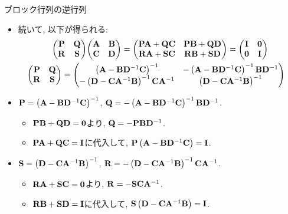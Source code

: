 \documentclass[dvipdfmx,notheorems,t]{beamer}
\begin{document}
\begin{frame}{ブロック行列の逆行列}
\begin{itemize}
  \item 続いて, 以下が得られる:
  \begin{gather*}
    \mqty(\vb{P} & \vb{Q} \\ \vb{R} & \vb{S}) \mqty(\vb{A} & \vb{B} \\ \vb{C} & \vb{D})
      = \mqty(\vb{P} \vb{A} + \vb{Q} \vb{C} & \vb{P} \vb{B} + \vb{Q} \vb{D} \\
        \vb{R} \vb{A} + \vb{S} \vb{C} & \vb{R} \vb{B} + \vb{S} \vb{D})
      = \mqty(\vb{I} & \vb{0} \\ \vb{0} & \vb{I}) \\
    \hspace*{-10pt} \mqty(\vb{P} & \vb{Q} \\ \vb{R} & \vb{S})
      = \mqty(\left( \vb{A} - \vb{B} \vb{D}^{-1} \vb{C} \right)^{-1} &
        -\left( \vb{A} - \vb{B} \vb{D}^{-1} \vb{C} \right)^{-1} \vb{B} \vb{D}^{-1} \\
        -\left( \vb{D} - \vb{C} \vb{A}^{-1} \vb{B} \right)^{-1} \vb{C} \vb{A}^{-1} &
        \left( \vb{D} - \vb{C} \vb{A}^{-1} \vb{B} \right)^{-1})
  \end{gather*}
  \item $\vb{P} = \left( \vb{A} - \vb{B} \vb{D}^{-1} \vb{C} \right)^{-1}$,
  $\vb{Q} = -\left( \vb{A} - \vb{B} \vb{D}^{-1} \vb{C} \right)^{-1} \vb{B} \vb{D}^{-1}$.
  \begin{itemize}
    \item $\vb{P} \vb{B} + \vb{Q} \vb{D} = \vb{0}$より, $\vb{Q} = -\vb{P} \vb{B} \vb{D}^{-1}$.
    \item $\vb{P} \vb{A} + \vb{Q} \vb{C} = \vb{I}$に代入して,
    $\vb{P} \left( \vb{A} - \vb{B} \vb{D}^{-1} \vb{C} \right) = \vb{I}$.
  \end{itemize}

  \item $\vb{S} = \left( \vb{D} - \vb{C} \vb{A}^{-1} \vb{B} \right)^{-1}$,
  $\vb{R} = -\left( \vb{D} - \vb{C} \vb{A}^{-1} \vb{B} \right)^{-1} \vb{C} \vb{A}^{-1}$.
  \begin{itemize}
    \item $\vb{R} \vb{A} + \vb{S} \vb{C} = \vb{0}$より, $\vb{R} = -\vb{S} \vb{C} \vb{A}^{-1}$.
    \item $\vb{R} \vb{B} + \vb{S} \vb{D} = \vb{I}$に代入して,
    $\vb{S} \left( \vb{D} - \vb{C} \vb{A}^{-1} \vb{B} \right) = \vb{I}$.
  \end{itemize}
\end{itemize}
\end{frame}
\end{document}
